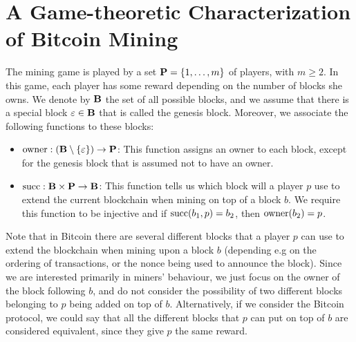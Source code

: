 \documentclass{article}
\begin{document}


\section{A Game-theoretic Characterization of Bitcoin Mining}

The mining game is played by a set $\mathbf{P} = \{1, \ldots, m\}$ of players, with $m \geq 2$. In this game, each player has some reward depending on the number of blocks she owns. We denote by $\mathbf{B}$ the set of all possible blocks, and we assume that there is a special block $\varepsilon \in \mathbf{B}$ that is called the genesis block. Moreover, we associate the following functions to these blocks:
\begin{itemize}
\item $\text{owner} : (\mathbf{B} \setminus \{\varepsilon\}) \to \mathbf{P}$: This function assigns an owner to each block, except for the genesis block that is assumed not to have an owner.

\item $\text{succ}: \mathbf{B} \times \mathbf{P} \to \mathbf{B}$: This function tells us which block will a player $p$ use to extend the current blockchain when mining on top of a block $b$. We require this function to be injective and if $\text{succ}(b_1,p)=b_2$, then $\text{owner}(b_2)=p$.
\end{itemize}

Note that in Bitcoin there are several different blocks that a player $p$ can use to extend the blockchain when mining upon a block $b$ (depending e.g on the ordering of transactions, or the nonce being used to announce the block). Since we are interested primarily in miners' behaviour, we just focus on the owner of the block following $b$, and do not consider the possibility of two different blocks belonging to $p$ being added on top of $b$. Alternatively, if we consider the Bitcoin protocol, we could say that all the different blocks that $p$ can put on top of $b$ are considered equivalent, since they give $p$ the same reward. %
\end{document}
